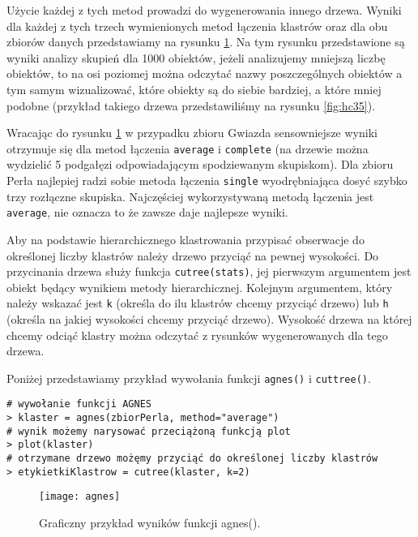 \documentclass[polish,]{book}
\begin{document}
Użycie każdej z tych metod prowadzi do wygenerowania innego drzewa. Wyniki
dla każdej z tych trzech wymienionych metod łączenia klastrów oraz dla obu zbiorów danych przedstawiamy na rysunku \ref{fig:agnes}. Na tym rysunku przedstawione są wyniki
analizy skupień dla 1000 obiektów, jeżeli analizujemy mniejszą liczbę obiektów, to
na osi poziomej można odczytać nazwy poszczególnych obiektów a tym samym wizualizować, które obiekty są do siebie bardziej, a które mniej podobne (przykład
takiego drzewa przedstawiliśmy na rysunku \ref{fig:hc35}).

Wracając do rysunku \ref{fig:agnes} w przypadku zbioru Gwiazda sensowniejsze wyniki
otrzymuje się dla metod łączenia \texttt{average} i \texttt{complete} (na drzewie można wydzielić
5 podgałęzi odpowiadającym spodziewanym skupiskom). Dla zbioru Perła najlepiej
radzi sobie metoda łączenia \texttt{single} wyodrębniająca dosyć szybko trzy rozłączne
skupiska. Najczęściej wykorzystywaną metodą łączenia jest \texttt{average}, nie oznacza to że zawsze daje najlepsze wyniki.

Aby na podstawie hierarchicznego klastrowania przypisać obserwacje do określonej liczby klastrów należy drzewo przyciąć na pewnej wysokości. Do przycinania
drzewa służy funkcja \texttt{cutree(stats)}, jej pierwszym argumentem jest obiekt będący
wynikiem metody hierarchicznej. Kolejnym argumentem, który należy wskazać jest
\texttt{k} (określa do ilu klastrów chcemy przyciąć drzewo) lub \texttt{h} (określa na jakiej wysokości
chcemy przyciąć drzewo). Wysokość drzewa na której chcemy odciąć klastry można
odczytać z rysunków wygenerowanych dla tego drzewa.

Poniżej przedstawiamy przykład wywołania funkcji \texttt{agnes()} i \texttt{cuttree()}.

\begin{verbatim}
# wywołanie funkcji AGNES
> klaster = agnes(zbiorPerla, method="average")
# wynik możemy narysować przeciążoną funkcją plot
> plot(klaster)
# otrzymane drzewo możęmy przyciąć do określonej liczby klastrów
> etykietkiKlastrow = cutree(klaster, k=2)
\end{verbatim}

\begin{figure}

{\centering \texttt{[image: agnes]} 

}

\caption{Graficzny przykład wyników funkcji agnes().}\label{fig:agnes}
\end{figure}
\end{document}
